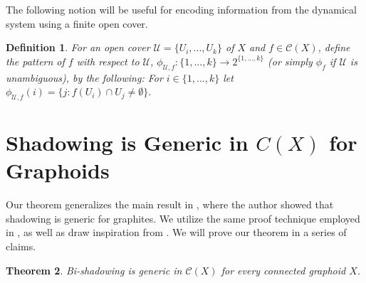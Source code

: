\documentclass{amsart}
\newtheorem{theorem}{Theorem}[section]
\newtheorem{definition}[theorem]{Definition}
\numberwithin{equation}{section}
\begin{document}
The following notion will be useful for encoding information from the dynamical system using a finite open cover.

\begin{definition}
    For an open cover $\mathcal{U}=\{U_i,...,U_k\}$ of $X$ and $f\in \mathcal C(X)$, define \emph{the pattern of $f$ with respect to $\mathcal{U}$}, $\phi_{\mathcal{U},f}:\{1,...,k\}\to 2^{\{1,...,k\}} $ (or simply $\phi_f$ if $\mathcal{U}$ is unambiguous), by the following: For $i\in\{1,...,k\}$ let $\phi_{\mathcal{U},f}(i)= \{j:f(U_i)\cap U_j\neq \emptyset\}.$
\end{definition}




\section{Shadowing is Generic in $C(X)$ for Graphoids} \label{sec: Main}



Our theorem generalizes the main result in \cite{genericshadowingmeddaugh}, where the author showed that shadowing is generic for graphites. We utilize the same proof technique employed in \cite{genericshadowingmeddaugh}, as well as draw inspiration from \cite{bishadowgenericoprocha}. We will prove our theorem in a series of claims.

\begin{theorem}
    Bi-shadowing is generic in $\mathcal C(X)$ for every connected graphoid $X$. %
\end{theorem}
\end{document}
